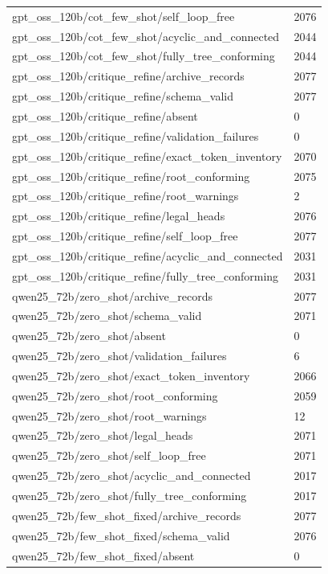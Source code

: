 \begin{tabular}{ll}
gpt\_oss\_120b/cot\_few\_shot/self\_loop\_free & 2076 \\
gpt\_oss\_120b/cot\_few\_shot/acyclic\_and\_connected & 2044 \\
gpt\_oss\_120b/cot\_few\_shot/fully\_tree\_conforming & 2044 \\
gpt\_oss\_120b/critique\_refine/archive\_records & 2077 \\
gpt\_oss\_120b/critique\_refine/schema\_valid & 2077 \\
gpt\_oss\_120b/critique\_refine/absent & 0 \\
gpt\_oss\_120b/critique\_refine/validation\_failures & 0 \\
gpt\_oss\_120b/critique\_refine/exact\_token\_inventory & 2070 \\
gpt\_oss\_120b/critique\_refine/root\_conforming & 2075 \\
gpt\_oss\_120b/critique\_refine/root\_warnings & 2 \\
gpt\_oss\_120b/critique\_refine/legal\_heads & 2076 \\
gpt\_oss\_120b/critique\_refine/self\_loop\_free & 2077 \\
gpt\_oss\_120b/critique\_refine/acyclic\_and\_connected & 2031 \\
gpt\_oss\_120b/critique\_refine/fully\_tree\_conforming & 2031 \\
qwen25\_72b/zero\_shot/archive\_records & 2077 \\
qwen25\_72b/zero\_shot/schema\_valid & 2071 \\
qwen25\_72b/zero\_shot/absent & 0 \\
qwen25\_72b/zero\_shot/validation\_failures & 6 \\
qwen25\_72b/zero\_shot/exact\_token\_inventory & 2066 \\
qwen25\_72b/zero\_shot/root\_conforming & 2059 \\
qwen25\_72b/zero\_shot/root\_warnings & 12 \\
qwen25\_72b/zero\_shot/legal\_heads & 2071 \\
qwen25\_72b/zero\_shot/self\_loop\_free & 2071 \\
qwen25\_72b/zero\_shot/acyclic\_and\_connected & 2017 \\
qwen25\_72b/zero\_shot/fully\_tree\_conforming & 2017 \\
qwen25\_72b/few\_shot\_fixed/archive\_records & 2077 \\
qwen25\_72b/few\_shot\_fixed/schema\_valid & 2076 \\
qwen25\_72b/few\_shot\_fixed/absent & 0 \\

\end{tabular}
